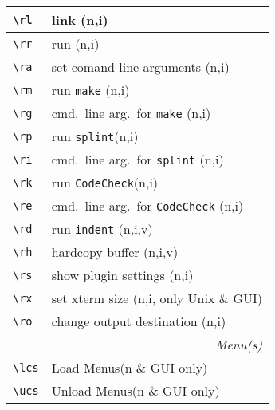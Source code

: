 \documentclass[oneside,10pt,a4paper,DIV24]{scrartcl}
\begin{document}
\begin{center}
\begin{tabular}[]{|p{14mm}|p{58mm}|}
\hline \verb'\rl'  & link                                    \hfill (n,i)\\
\hline \verb'\rr'  & run                                     \hfill (n,i)\\
\hline \verb'\ra'  & set comand line arguments               \hfill (n,i)\\
\hline \verb'\rm'  & run \texttt{make}                       \hfill (n,i)\\
\hline \verb'\rg'  & cmd.\ line arg.\ for \texttt{make}      \hfill (n,i)\\
%
\hline 
\hline \verb'\rp'  & run \texttt{splint}\footnotemark[1]     \hfill (n,i)\\
\hline \verb'\ri'  & cmd.\ line arg.\ for \texttt{splint}    \hfill (n,i)\\
%
\hline \verb'\rk'  & run \texttt{CodeCheck}\footnotemark[2]  \hfill (n,i)\\
\hline \verb'\re'  & cmd.\ line arg.\ for \texttt{CodeCheck} \hfill (n,i)\\
%
\hline 
\hline \verb'\rd'  & run \texttt{indent}         \hfill (n,i,v)\\
\hline \verb'\rh'  & hardcopy buffer             \hfill (n,i,v)\\
\hline \verb'\rs'  & show plugin settings        \hfill (n,i)\\
\hline \verb'\rx'  & set xterm size              \hfill (n,i, only Unix \& GUI)\\
\hline \verb'\ro'  & change output destination   \hfill (n,i)\\
\hline
%
\hline
\multicolumn{2}{|r|}{\textsl{Menu(s)}}\\
\hline \verb'\lcs'  & Load    Menus\hfill \scriptsize{(n \& GUI only)}\\
\hline \verb'\ucs'  & Unload  Menus\hfill \scriptsize{(n \& GUI only)}\\
\hline
\end{tabular} \\
%
%
\end{center}
\end{document}
